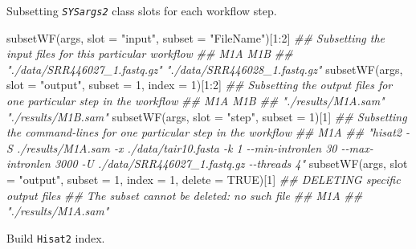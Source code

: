 \documentclass[14pt,]{article}
\newcommand{\hlnum}[1]{\textcolor[rgb]{0.816,0.125,0.439}{#1}}%
\newcommand{\hlstr}[1]{\textcolor[rgb]{0.251,0.627,0.251}{#1}}%
\newcommand{\hlcom}[1]{\textcolor[rgb]{0.502,0.502,0.502}{\textit{#1}}}%
\newcommand{\hlstd}[1]{\textcolor[rgb]{0.251,0.251,0.251}{#1}}%
\newenvironment{Shaded}{\begin{myshaded}}{\end{myshaded}}
\newcommand{\DecValTok}[1]{\hlnum{#1}}
\newcommand{\ConstantTok}[1]{\hlnum{#1}}
\newcommand{\SpecialCharTok}[1]{\hlstr{#1}}
\newcommand{\StringTok}[1]{\hlstr{#1}}
\newcommand{\DocumentationTok}[1]{\hlcom{#1}}
\newcommand{\FunctionTok}[1]{\hlstd{#1}}
\newcommand{\AttributeTok}[1]{{#1}}
\newcommand{\NormalTok}[1]{\hlstd{#1}}
\begin{document}
Subsetting \emph{\texttt{SYSargs2}} class slots for each workflow step.

\begin{Shaded}
\begin{Highlighting}[]
\FunctionTok{subsetWF}\NormalTok{(args, }\AttributeTok{slot =} \StringTok{"input"}\NormalTok{, }\AttributeTok{subset =} \StringTok{"FileName"}\NormalTok{)[}\DecValTok{1}\SpecialCharTok{:}\DecValTok{2}\NormalTok{]  }\DocumentationTok{\#\# Subsetting the input files for this particular workflow }
\DocumentationTok{\#\#                           M1A                           M1B }
\DocumentationTok{\#\# "./data/SRR446027\_1.fastq.gz" "./data/SRR446028\_1.fastq.gz"}
\FunctionTok{subsetWF}\NormalTok{(args, }\AttributeTok{slot =} \StringTok{"output"}\NormalTok{, }\AttributeTok{subset =} \DecValTok{1}\NormalTok{, }\AttributeTok{index =} \DecValTok{1}\NormalTok{)[}\DecValTok{1}\SpecialCharTok{:}\DecValTok{2}\NormalTok{]  }\DocumentationTok{\#\# Subsetting the output files for one particular step in the workflow }
\DocumentationTok{\#\#                 M1A                 M1B }
\DocumentationTok{\#\# "./results/M1A.sam" "./results/M1B.sam"}
\FunctionTok{subsetWF}\NormalTok{(args, }\AttributeTok{slot =} \StringTok{"step"}\NormalTok{, }\AttributeTok{subset =} \DecValTok{1}\NormalTok{)[}\DecValTok{1}\NormalTok{]  }\DocumentationTok{\#\# Subsetting the command{-}lines for one particular step in the workflow }
\DocumentationTok{\#\#                                                                                                                                               M1A }
\DocumentationTok{\#\# "hisat2 {-}S ./results/M1A.sam  {-}x ./data/tair10.fasta  {-}k 1  {-}{-}min{-}intronlen 30  {-}{-}max{-}intronlen 3000  {-}U ./data/SRR446027\_1.fastq.gz {-}{-}threads 4"}
\FunctionTok{subsetWF}\NormalTok{(args, }\AttributeTok{slot =} \StringTok{"output"}\NormalTok{, }\AttributeTok{subset =} \DecValTok{1}\NormalTok{, }\AttributeTok{index =} \DecValTok{1}\NormalTok{, }\AttributeTok{delete =} \ConstantTok{TRUE}\NormalTok{)[}\DecValTok{1}\NormalTok{]  }\DocumentationTok{\#\# DELETING specific output files}
\DocumentationTok{\#\# The subset cannot be deleted: no such file}
\DocumentationTok{\#\#                 M1A }
\DocumentationTok{\#\# "./results/M1A.sam"}
\end{Highlighting}
\end{Shaded}

Build \texttt{Hisat2} index.
\end{document}
